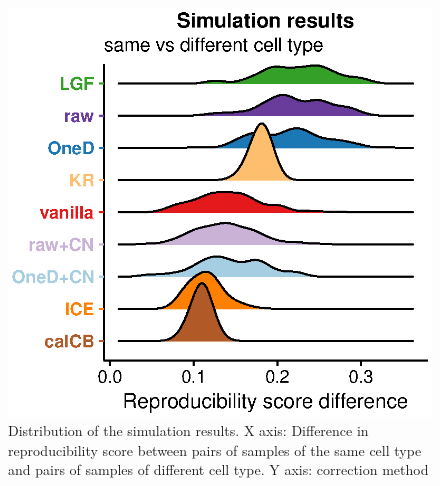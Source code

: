 \documentclass[12pt]{report}
\begin{document}
\begin{figure}
	\centerline{\includegraphics[width=\textwidth]{nar_figures/supp_figure_12.eps}}
    \caption{
    Distribution of the simulation results. X axis: Difference in
    reproducibility score between pairs of samples of the same cell type and
    pairs of samples of different cell type. Y axis: correction method}
\end{figure}
\end{document}
